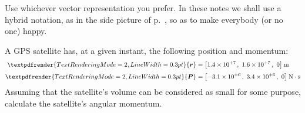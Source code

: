 \documentclass[a4paper,12pt,%
onecolumn,oneside,titlepage,%
british%
]{memoir}
\renewcommand*{\bm}[1]{\textpdfrender{TextRenderingMode=2,LineWidth=0.3pt}{\boldsymbol{#1}}}
\renewcommand*{\|}[1][]{\nonscript\:#1\vert\nonscript\:\mathopen{}}
\newcommand*{\yr}{\bm{r}}
\newcommand*{\yP}{\bm{P}}
\begin{document}
Use whichever vector representation you prefer. In these notes we shall use a hybrid notation, as in the side picture of p.~\pageref{fig:volumetwistedarrow}, so as to make everybody (or no one) happy.

\begin{exercise}
  A GPS satellite has, at a given instant, the following position and momentum:
  \begin{equation*}
    \begin{split}
      \yr &=\bigl[
      \num[exponent-mode=scientific]{1.4e+7}\,,\ 
      \num[exponent-mode=scientific]{1.6e+7}\,,\ 
      0\bigr]\:\unit{m}
      \\[\jot]
      \yP &=\bigl[
      \num[exponent-mode=scientific]{-3.1e+6}\,,\ 
      \num[exponent-mode=scientific]{3.4e+6}\,,\ 
      0\bigr]\:\unit{N\cdot s}
    \end{split}
  \end{equation*}
  Assuming that the satellite's volume can be considered as small for some purpose, calculate the satellite's angular momentum.
\end{exercise}


\bigskip
\end{document}
